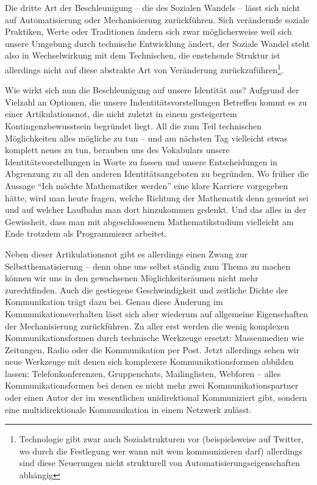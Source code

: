 Die dritte Art der Beschleunigung – die des Sozialen Wandels – lässt sich nicht auf Automatisierung oder Mechanisierung zurückführen.
Sich verändernde soziale Praktiken, Werte oder Traditionen ändern sich zwar möglicherweise weil sich unsere Umgebung durch technische Entwicklung ändert,
der Soziale Wandel steht also in Wechselwirkung mit dem Technischen\parencite[172]{rosa1}, die enstehende Struktur ist allerdings nicht auf diese abstrakte Art von Veränderung zurückzuführen\footnote{Technologie gibt zwar auch Sozialstrukturen vor (beispielsweise auf Twitter, wo durch die Festlegung wer wann mit wem kommunizieren darf) allerdings sind diese Neuerungen nicht strukturell von Automatisierungseigenschaften abhängig}.

Wie wirkt sich nun die Beschleunigung auf unsere Identität aus? Aufgrund der Vielzahl an Optionen, die unsere Indentitätsvorstellungen Betreffen kommt es zu einer Artikulationsnot, die nicht zuletzt in einem gesteigertem Kontingenzbewusstsein begründet liegt.
All die zum Teil technischen Möglichkeiten alles mögliche zu tun – und am nächsten Tag vielleicht etwas komplett neues zu tun, berauben uns des Vokabulars unsere Identitätsvorstellungen in Worte zu fassen und unsere Entscheidungen in Abgrenzung zu all den anderen Identitätsangeboten zu begründen.
Wo früher die Aussage \enquote{Ich möchte Mathematiker werden} eine klare Karriere vorgegeben hätte, wird man heute fragen, welche Richtung der Mathematik denn gemeint sei und auf welcher Laufbahn man dort hinzukommen gedenkt.
Und das alles in der Gewissheit, dass man mit abgeschlossenem Mathematikstudium vielleicht am Ende trotzdem als Programmierer arbeitet.

Neben dieser Artikulationsnot gibt es allerdings einen Zwang zur Selbstthematisierung – denn ohne uns selbst ständig zum Thema zu machen können wir uns in den gewachsenen Möglichkeitsräumen nicht mehr zurechtfinden.
Auch die gestiegene Geschwindigkeit und zeitliche Dichte der Kommunikation trägt dazu bei.
Genau diese Änderung im Kommunikationsverhalten lässt sich aber wiederum auf allgemeine Eigenschaften der Mechanisierung zurückführen.
Zu aller erst werden die wenig komplexen Kommunikationsformen durch technische Werkzeuge ersetzt: Massenmedien wie Zeitungen, Radio oder die Kommunikation per Post. Jetzt allerdings sehen wir neue Werkzeuge mit denen sich komplexere Kommunikationsformen abbilden lassen: Telefonkonferenzen, Gruppenchats, Mailinglisten, Webforen – alles Kommunikationsformen bei denen es nicht mehr zwei Kommunikationspartner oder einen Autor der im wesentlichen unidirektional Kommuniziert gibt, sondern eine multidirektionale Kommunikation in einem Netzwerk zulässt.

